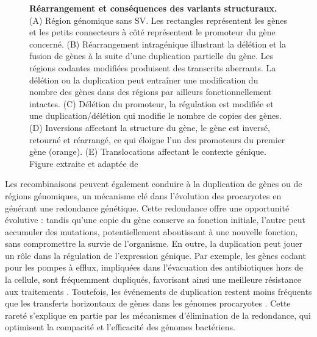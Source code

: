 \begin{figure}[htbp]
    \centering
    \caption[Réarrangement et implication]{\textbf{Réarrangement et conséquences des variants structuraux.} (A) Région génomique sans SV. Les rectangles représentent les gènes et les petits connecteurs à côté représentent le promoteur du gène concerné. (B) Réarrangement intragénique illustrant la délétion et la fusion de gènes à la suite d'une duplication partielle du gène. Les régions codantes modifiées produisent des transcrits aberrants. La délétion ou la duplication peut entraîner une modification du nombre des gènes dans des régions par ailleurs fonctionnellement intactes. (C) Délétion du promoteur, la régulation est modifiée et une duplication/délétion qui modifie le nombre de copies des gènes. (D) Inversions affectant la structure du gène, le gène est inversé, retourné et réarrangé, ce qui éloigne l'un des promoteurs du premier gène (orange). (E) Translocations affectant le contexte génique. Figure extraite et adaptée de \cite{periwal_insights_2015}}
    \label{fig:rearrangement}
\end{figure}

Les recombinaisons peuvent également conduire à la duplication de gènes ou de régions génomiques, un mécanisme clé dans l’évolution des procaryotes en générant une redondance génétique. Cette redondance offre une opportunité évolutive : tandis qu’une copie du gène conserve sa fonction initiale, l’autre peut accumuler des mutations, potentiellement aboutissant à une nouvelle fonction, sans compromettre la survie de l’organisme. En outre, la duplication peut jouer un rôle dans la régulation de l’expression génique. Par exemple, les gènes codant pour les pompes à efflux, impliquées dans l’évacuation des antibiotiques hors de la cellule, sont fréquemment dupliqués, favorisant ainsi une meilleure résistance aux traitements \cite{maddamsetti_duplicated_2024}. Toutefois, les événements de duplication restent moins fréquents que les transferts horizontaux de gènes dans les génomes procaryotes \cite{tria_gene_2021}. Cette rareté s’explique en partie par les mécanismes d’élimination de la redondance, qui optimisent la compacité et l’efficacité des génomes bactériens.


